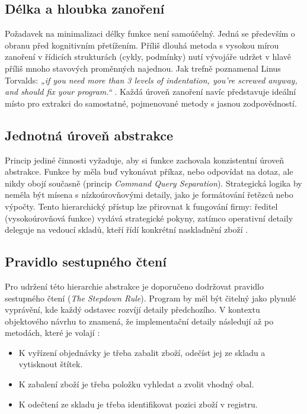 \documentclass[FM,DP,fonts]{tulthesis}
\begin{document}
\subsection{Délka a hloubka zanoření}
Požadavek na minimalizaci délky funkce není samoúčelný. Jedná se především o obranu před kognitivním přetížením. Příliš dlouhá metoda s vysokou mírou zanoření v řídicích strukturách (cykly, podmínky) nutí vývojáře udržet v hlavě příliš mnoho stavových proměnných najednou. Jak trefně poznamenal Linus Torvalds: \textit{„if you need more than 3 levels of indentation, you're screwed anyway, and should fix your program.“} \parencite{torvalds-indentation}. Každá úroveň zanoření navíc představuje ideální místo pro extrakci do samostatné, pojmenované metody s jasnou zodpovědností.

\subsection{Jednotná úroveň abstrakce}
Princip jediné činnosti vyžaduje, aby si funkce zachovala konzistentní úroveň abstrakce. Funkce by měla buď vykonávat příkaz, nebo odpovídat na dotaz, ale nikdy obojí současně (princip \textit{Command Query Separation}). Strategická logika by neměla být mísena s nízkoúrovňovými detaily, jako je formátování řetězců nebo výpočty. Tento hierarchický přístup lze přirovnat k fungování firmy: ředitel (vysokoúrovňová funkce) vydává strategické pokyny, zatímco operativní detaily deleguje na vedoucí skladů, kteří řídí konkrétní naskladnění zboží \parencite{martin-clean-code}.

\subsection{Pravidlo sestupného čtení}
Pro udržení této hierarchie abstrakce je doporučeno dodržovat pravidlo sestupného čtení (\textit{The Stepdown Rule}). Program by měl být čitelný jako plynulé vyprávění, kde každý odstavec rozvíjí detaily předchozího. V kontextu objektového návrhu to znamená, že implementační detaily následují až po metodách, které je volají \parencite{martin-clean-code}:
\begin{itemize}
	\item K vyřízení objednávky je třeba zabalit zboží, odečíst jej ze skladu a vytisknout štítek.
	\item K zabalení zboží je třeba položku vyhledat a zvolit vhodný obal.
	\item K odečtení ze skladu je třeba identifikovat pozici zboží v registru.
\end{itemize}
\end{document}
